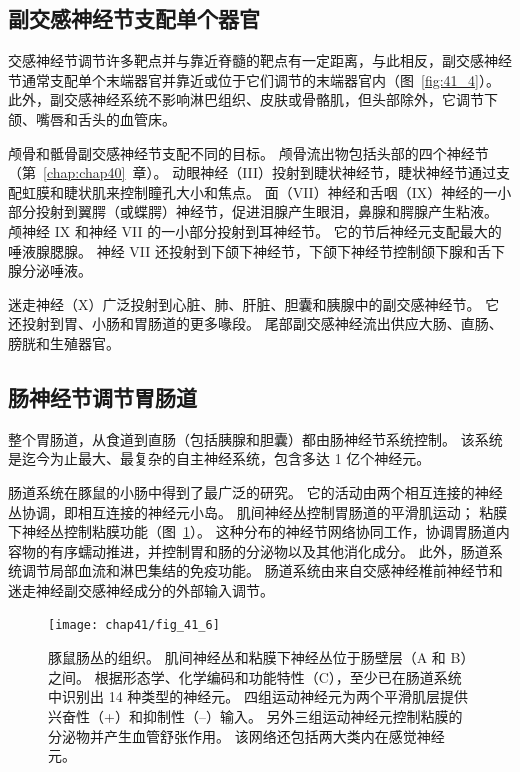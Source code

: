 \subsection{副交感神经节支配单个器官}

交感神经节调节许多靶点并与靠近脊髓的靶点有一定距离，与此相反，副交感神经节通常支配单个末端器官并靠近或位于它们调节的末端器官内（图~\ref{fig:41_4}）。
此外，副交感神经系统不影响淋巴组织、皮肤或骨骼肌，但头部除外，它调节下颌、嘴唇和舌头的血管床。


颅骨和骶骨副交感神经节支配不同的目标。
颅骨流出物包括头部的四个神经节（第~\ref{chap:chap40}~章）。
动眼神经（III）投射到睫状神经节，睫状神经节通过支配虹膜和睫状肌来控制瞳孔大小和焦点。
面（VII）神经和舌咽（IX）神经的一小部分投射到翼腭（或蝶腭）神经节，促进泪腺产生眼泪，鼻腺和腭腺产生粘液。
颅神经 IX 和神经 VII 的一小部分投射到耳神经节。 它的节后神经元支配最大的唾液腺腮腺。
神经 VII 还投射到下颌下神经节，下颌下神经节控制颌下腺和舌下腺分泌唾液。


迷走神经（X）广泛投射到心脏、肺、肝脏、胆囊和胰腺中的副交感神经节。
它还投射到胃、小肠和胃肠道的更多喙段。
尾部副交感神经流出供应大肠、直肠、膀胱和生殖器官。



\subsection{肠神经节调节胃肠道}

整个胃肠道，从食道到直肠（包括胰腺和胆囊）都由肠神经节系统控制。
该系统是迄今为止最大、最复杂的自主神经系统，包含多达 1 亿个神经元。


肠道系统在豚鼠的小肠中得到了最广泛的研究。
它的活动由两个相互连接的神经丛协调，即相互连接的神经元小岛。
肌间神经丛控制胃肠道的平滑肌运动；
粘膜下神经丛控制粘膜功能（图~\ref{fig:41_6}）。 
这种分布的神经节网络协同工作，协调胃肠道内容物的有序蠕动推进，并控制胃和肠的分泌物以及其他消化成分。
此外，肠道系统调节局部血流和淋巴集结的免疫功能。
肠道系统由来自交感神经椎前神经节和迷走神经副交感神经成分的外部输入调节。



\begin{figure}[htbp]
	\centering
	\texttt{[image: chap41/fig\_41\_6]}
	\caption{豚鼠肠丛的组织。
		肌间神经丛和粘膜下神经丛位于肠壁层（A 和 B）之间。
		根据形态学、化学编码和功能特性（C），至少已在肠道系统中识别出 14 种类型的神经元。
		四组运动神经元为两个平滑肌层提供兴奋性（+）和抑制性（–）输入。
		另外三组运动神经元控制粘膜的分泌物并产生血管舒张作用。
		该网络还包括两大类内在感觉神经元。\cite{furness1980types}}
	\label{fig:41_6}
\end{figure}


